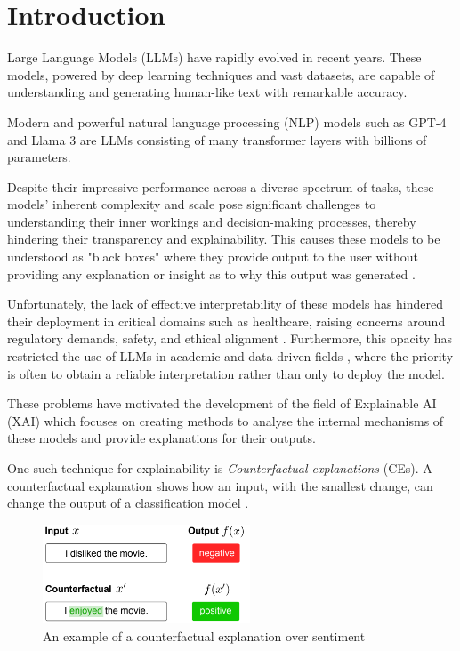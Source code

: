\chapter{Introduction}

Large Language Models (LLMs) have rapidly evolved in recent years. These models, powered by deep learning techniques and vast datasets, are capable of understanding and generating human-like text with remarkable accuracy.

Modern and powerful natural language processing (NLP) models such as GPT-4 \cite{openai_gpt-4_2023} and Llama 3 \cite{dubey_llama_2024} are LLMs consisting of many transformer layers with billions of parameters. 

Despite their impressive performance across a diverse spectrum of tasks, these models' inherent complexity and scale pose significant challenges to understanding their inner workings and decision-making processes, thereby hindering their transparency and explainability. This causes these models to be understood as "black boxes" where they provide output to the user without providing any explanation or insight as to why this output was generated \cite{adadi_peeking_2018}. 

Unfortunately, the lack of effective interpretability of these models has hindered their deployment in critical domains such as healthcare, raising concerns around regulatory demands, safety, and ethical alignment \cite{goodman_european_2017, amodei_concrete_2016}. Furthermore, this opacity has restricted the use of LLMs in academic and data-driven fields \cite{ziems_can_2024}, where the priority is often to obtain a reliable interpretation rather than only to deploy the model. 

These problems have motivated the development of the field of Explainable AI (XAI) \cite{gilpin_explaining_2019} which focuses on creating methods to analyse the internal mechanisms of these models and provide explanations for their outputs.

One such technique for explainability is \emph{Counterfactual explanations} (CEs). A counterfactual explanation shows how an input, with the smallest change, can change the output of a classification model \cite{wachter_counterfactual_2017}.

\begin{figure}[h]
    \centering
    \includegraphics[width=0.55\textwidth]{counterfactual_intent_example.png}
    \caption{An example of a counterfactual explanation over sentiment \cite{mcaleese_comparative_2024}}
    \label{fig:enter-label}
\end{figure}

